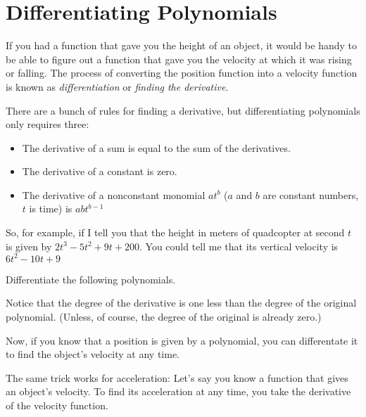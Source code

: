 \chapter{Differentiating Polynomials}

If you had a function that gave you the height of an object, it would
be handy to be able to figure out a function that gave you the
velocity at which it was rising or falling. The process of converting
the position function into a velocity function is known as
\emph{differentiation} or \emph{finding the derivative}.

There are a bunch of rules for finding a derivative, but
differentiating polynomials only requires three:
\begin{itemize}
\item The derivative of a sum is equal to the sum of the derivatives.
\item The derivative of a constant is zero.
\item The derivative of a nonconstant monomial $at^b$ ($a$ and $b$ are constant numbers, $t$ is time) is $abt^{b-1}$ 
\end{itemize}

So, for example, if I tell you that the height in meters of quadcopter
at second $t$ is given by $2t^3 - 5t^2 + 9t + 200$. You could tell me
that its vertical velocity is $6t^{2} - 10t + 9$

\begin{Exercise}[title={Differentation of polynomials}, label=diffpoly]
  Differentiate the following polynomials.
\end{Exercise}
\begin{Answer}[ref=diffpoly]
\end{Answer}
Notice that the degree of the derivative is one less than the degree
of the original polynomial. (Unless, of course, the degree of the
original is already zero.)

Now, if you know that a position is given by a polynomial, you can
differentate it to find the object's velocity at any time.

The same trick works for acceleration: Let's say you know a function
that gives an object's velocity. To find its acceleration at any time,
you take the derivative of the velocity function.

